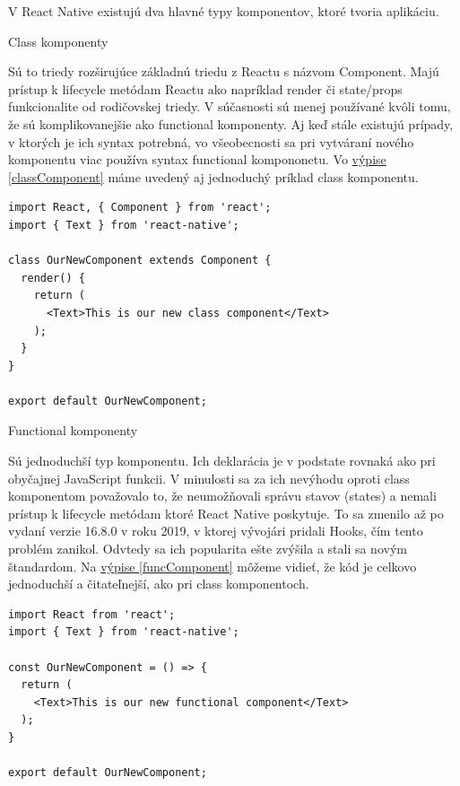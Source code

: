 V React Native existujú dva hlavné typy komponentov, ktoré tvoria aplikáciu.
\begin{itemize}[leftmargin=*]
{\bf \item Class komponenty} \newline
Sú to triedy rozširujúce základnú triedu z Reactu s názvom Component. Majú prístup k lifecycle metódam Reactu ako napríklad render či state/props funkcionalite od rodičovskej triedy. V súčasnosti sú menej používané kvôli tomu, že sú komplikovanejšie ako functional komponenty. Aj keď stále existujú prípady, v ktorých je ich syntax potrebná, vo všeobecnosti sa pri vytváraní nového komponentu viac používa syntax functional kompononetu. Vo \hyperref[classComponent]{výpise \ref{classComponent}} máme uvedený aj jednoduchý príklad class komponentu.  \\

\begin{lstlisting}[caption={Príklad class komponentu}, label={classComponent}]
import React, { Component } from 'react';
import { Text } from 'react-native';

class OurNewComponent extends Component {
  render() {
    return (
      <Text>This is our new class component</Text>
    );
  }
}

export default OurNewComponent;
\end{lstlisting}
{\bf \item Functional komponenty} \newline
Sú jednoduchší typ komponentu. Ich deklarácia je v podstate rovnaká ako pri obyčajnej JavaScript funkcii. V minulosti sa za ich nevýhodu oproti class komponentom považovalo to, že neumožňovali správu stavov (states) a nemali prístup k lifecycle metódam ktoré React Native poskytuje. To sa zmenilo až po vydaní verzie 16.8.0 v roku 2019, v ktorej vývojári pridali Hooks, čím tento problém zanikol. \cite{hooks} Odvtedy sa ich popularita ešte zvýšila a stali sa novým štandardom. Na \hyperref[funcComponent]{výpise \ref{funcComponent}} môžeme vidieť, že kód je celkovo jednoduchší a čitateľnejší, ako pri class komponentoch. \\

\begin{lstlisting}[caption={Príklad function komponentu}, label={funcComponent}]
import React from 'react';
import { Text } from 'react-native';

const OurNewComponent = () => {
  return (
    <Text>This is our new functional component</Text>
  );
}

export default OurNewComponent;
\end{lstlisting}

\end{itemize}

